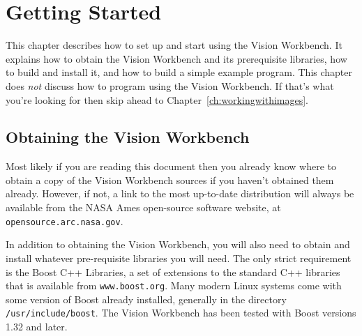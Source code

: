 \chapter{Getting Started}\label{ch:gettingstarted}

This chapter describes how to set up and start using the Vision
Workbench.  It explains how to obtain the Vision Workbench and its
prerequisite libraries, how to build and install it, and how to build
a simple example program.  This chapter does {\it not} discuss how to
program using the Vision Workbench.  If that's what you're looking for
then skip ahead to Chapter~\ref{ch:workingwithimages}.

\section{Obtaining the Vision Workbench}
\label{sec:obtaining-vw}

Most likely if you are reading this document then you already know 
where to obtain a copy of the Vision Workbench sources if you haven't 
obtained them already.  However, if not, a link to the most up-to-date 
distribution will always be available from the NASA Ames open-source 
software website, at \verb#opensource.arc.nasa.gov#.

In addition to obtaining the Vision Workbench, you will also need to
obtain and install whatever pre-requisite libraries you will need.
The only strict requirement is the Boost C++ Libraries, a set of
extensions to the standard C++ libraries that is available from
\verb#www.boost.org#.  Many modern Linux systems come with some
version of Boost already installed, generally in the directory
\verb#/usr/include/boost#.  The Vision Workbench has been tested with
Boost versions 1.32 and later.

